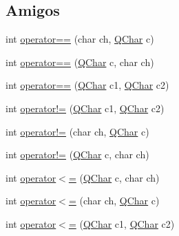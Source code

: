 \subsection*{Amigos}
\begin{DoxyCompactItemize}
\item 
int \hyperlink{class_q_char_a626d918781f80dcff42d03ff6749930d}{operator==} (char ch, \hyperlink{class_q_char}{Q\-Char} c)
\item 
int \hyperlink{class_q_char_a2deebc031e4e7ddaf75f71439b0ec58a}{operator==} (\hyperlink{class_q_char}{Q\-Char} c, char ch)
\item 
int \hyperlink{class_q_char_acf4eb1b3bdf933d74ba2506bac36c5a0}{operator==} (\hyperlink{class_q_char}{Q\-Char} c1, \hyperlink{class_q_char}{Q\-Char} c2)
\item 
int \hyperlink{class_q_char_a166bb280e1dab17703d96e00c39c97ab}{operator!=} (\hyperlink{class_q_char}{Q\-Char} c1, \hyperlink{class_q_char}{Q\-Char} c2)
\item 
int \hyperlink{class_q_char_a1b92f64e5743d28c56a489a5d7ad585b}{operator!=} (char ch, \hyperlink{class_q_char}{Q\-Char} c)
\item 
int \hyperlink{class_q_char_adace471124ee79e40a78029bb638ae7a}{operator!=} (\hyperlink{class_q_char}{Q\-Char} c, char ch)
\item 
int \hyperlink{class_q_char_a509b164e80d1625ab984e0ed147c31c6}{operator$<$=} (\hyperlink{class_q_char}{Q\-Char} c, char ch)
\item 
int \hyperlink{class_q_char_a93bcb6e42c1ed37d592b901d55f20449}{operator$<$=} (char ch, \hyperlink{class_q_char}{Q\-Char} c)
\item 
int \hyperlink{class_q_char_a9abfb242d26e415adaa25d52fd8a93fd}{operator$<$=} (\hyperlink{class_q_char}{Q\-Char} c1, \hyperlink{class_q_char}{Q\-Char} c2)
\end{DoxyCompactItemize}
